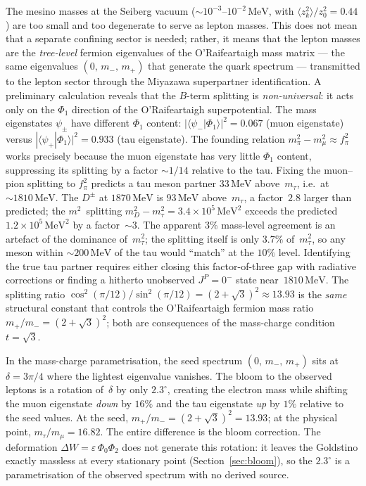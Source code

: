 \documentclass[12pt,a4paper]{article}
\newcommand{\MeV}{\,\text{MeV}}
\newcommand{\fpi}{f_\pi}
\begin{document}
The mesino masses at the Seiberg vacuum ($\sim 10^{-3}$--$10^{-2}\MeV$,
with $\langle z_k^2\rangle/z_0^2 = 0.44$) are too small and too
degenerate to serve as lepton masses. This does not mean that
a separate confining sector is needed; rather, it means that the
lepton masses are the \emph{tree-level} fermion eigenvalues of
the O'Raifeartaigh mass matrix --- the same eigenvalues
$(0,\, m_-,\, m_+)$ that generate the quark spectrum --- transmitted
to the lepton sector through the Miyazawa superpartner identification.
A preliminary calculation reveals that the $B$-term splitting
is \emph{non-universal}: it acts only on the $\Phi_1$ direction
of the O'Raifeartaigh superpotential. The mass eigenstates
$\psi_\pm$ have different $\Phi_1$ content:
$|\langle\psi_-|\Phi_1\rangle|^2 = 0.067$ (muon eigenstate) versus
$|\langle\psi_+|\Phi_1\rangle|^2 = 0.933$ (tau eigenstate).
The founding relation $m_\pi^2 - m_\mu^2 \approx \fpi^2$ works
precisely because the muon eigenstate has very little $\Phi_1$
content, suppressing its splitting by a factor $\sim 1/14$ relative
to the tau.  Fixing the muon--pion splitting to $\fpi^2$ predicts
a tau meson partner $33\MeV$ above~$m_\tau$, i.e.\ at $\sim 1810\MeV$.
The $D^\pm$ at $1870\MeV$ is $93\MeV$ above~$m_\tau$, a factor~$2.8$
larger than predicted; the $m^2$~splitting
$m_D^2 - m_\tau^2 = 3.4 \times 10^5\MeV^2$ exceeds the predicted
$1.2 \times 10^5\MeV^2$ by a factor~$\sim 3$.
The apparent $3\%$ mass-level agreement is an artefact of the
dominance of~$m_\tau^2$; the splitting itself is only
$3.7\%$ of~$m_\tau^2$, so any meson within
$\sim 200\MeV$ of the tau would ``match'' at the $10\%$ level.
Identifying the true tau partner requires either closing this
factor-of-three gap with radiative corrections or finding a
hitherto unobserved $J^P = 0^-$ state near~$1810\MeV$.
The splitting ratio $\cos^2(\pi/12)/\sin^2(\pi/12) = (2+\sqrt{3})^2
\approx 13.93$ is the \emph{same} structural constant that controls
the O'Raifeartaigh fermion mass ratio $m_+/m_- = (2+\sqrt{3})^2$;
both are consequences of the mass-charge condition $t = \sqrt{3}$.

In the mass-charge parametrisation, the seed spectrum
$(0,\, m_-,\, m_+)$ sits at $\delta = 3\pi/4$ where the lightest
eigenvalue vanishes.  The bloom to the observed leptons is a rotation
of~$\delta$ by only $2.3^\circ$, creating the electron mass while shifting
the muon eigenstate \emph{down} by $16\%$ and the tau eigenstate
\emph{up} by $1\%$ relative to the seed values.
At the seed, $m_+/m_- = (2+\sqrt{3})^2 = 13.93$; at the
physical point, $m_\tau/m_\mu = 16.82$.  The entire
difference is the bloom correction.
The deformation $\Delta W = \varepsilon\,\Phi_0\Phi_2$ does not generate
this rotation: it leaves the Goldstino exactly massless at every
stationary point (Section~\ref{sec:bloom}), so the $2.3^\circ$ is a
parametrisation of the observed spectrum with no derived source.
\end{document}
